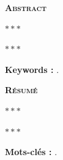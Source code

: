 
    \begin{multicols}{2} \small
        
        
        \begin{center}
            \textbf{\textsc{Abstract}}
        \end{center}
        \begin{center}
            $\ast \ast \ast$
        \end{center}
        
        \lipsum[1-2]
        
        \begin{center}
            $\ast \ast \ast$
        \end{center}
        
        \textbf{Keywords :} .
        
        \columnbreak
        
        
        \begin{center}
            \textbf{\textsc{Résumé}}
        \end{center}
        \begin{center}
            $\ast \ast \ast$
        \end{center}
        
        \lipsum[3-4]
        
        \begin{center}
            $\ast \ast \ast$
        \end{center}
        
        \textbf{Mots-clés :} .
        
    \end{multicols}

